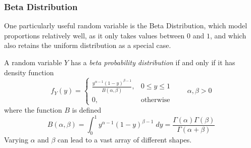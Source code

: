 \documentclass[12pt]{article}
\theoremstyle{plain}
\theoremstyle{definition}
\theoremstyle{remark}
\begin{document}



\clearpage
\subsubsection{Beta Distribution}

One particularly useful random variable is the Beta Distribution, which
model proportions relatively well, as it only takes values between
$0$ and $1$, and which also retains the uniform distribution as a special
case.

A random variable $Y$ has a \emph{beta probability distribution} if
and only if it has density function
\begin{equation}
   \label{pdf}
   f_Y(y) = \begin{cases} \frac{y^{\alpha -1} (1-y)^{\beta-1}}{B(\alpha,
      \beta)}, & 0\leq y \leq 1 \\
	 0, & \text{otherwise}
   \end{cases} \qquad \alpha, \beta > 0
\end{equation}
where the function $B$ is defined
   \[ B(\alpha, \beta) = \int^1_0 y^{\alpha-1}(1-y)^{\beta-1} \; dy =
      \frac{\Gamma(\alpha)\Gamma(\beta)}{\Gamma(\alpha + \beta)} \]
Varying $\alpha$ and $\beta$ can lead to a vast array of different
shapes.
\end{document}
